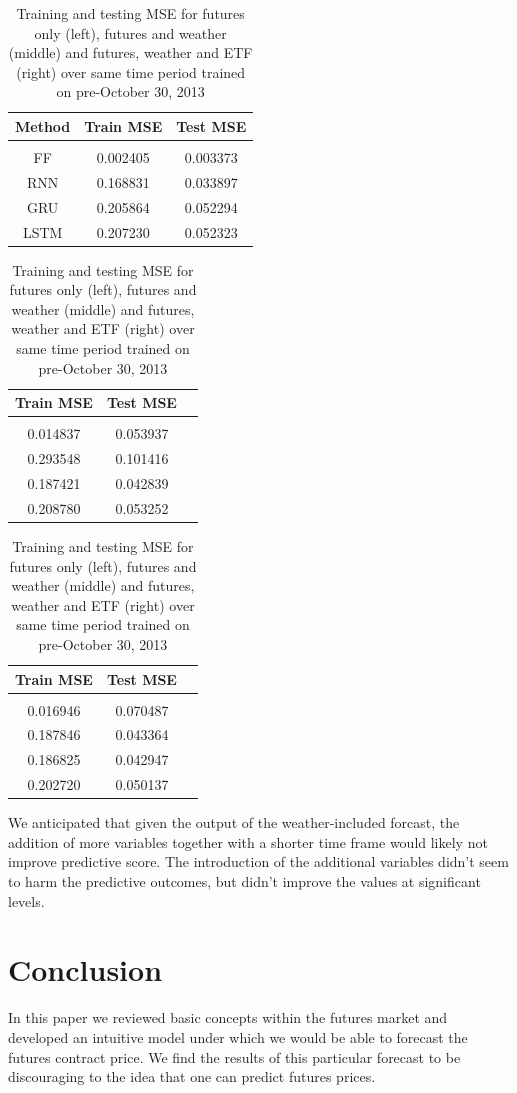 \documentclass[twoside,11pt]{article}
\begin{document}
\begin{table}[h!]
		\begin{tabular}{ccc}
			Method & Train MSE & Test MSE \\
			\hline \\[-11pt]
			FF& 0.002405 & 0.003373 \\
			RNN & 0.168831 & 0.033897 \\ 
			GRU & 0.205864 & 0.052294 \\
			LSTM & 0.207230 & 0.052323 \\
			\hline
		\end{tabular}
		\begin{tabular}{ccc}
			Train MSE & Test MSE \\
			\hline \\[-11pt]
			0.014837 & 0.053937 \\
			0.293548 & 0.101416 \\ 
			0.187421 & 0.042839 \\
			0.208780 & 0.053252 \\
			\hline
		\end{tabular}
			\begin{tabular}{ccc}
		Train MSE & Test MSE \\
		\hline \\[-11pt]
		0.016946 & 0.070487 \\
		0.187846 & 0.043364 \\ 
		0.186825 & 0.042947 \\
		0.202720 & 0.050137 \\
		\hline
	\end{tabular}
		\label{tab:futuresweatherandetf}
		\caption{Training and testing MSE for futures only (left), futures and weather (middle) and futures, weather and ETF (right) over same time period trained on pre-October 30, 2013}
\end{table}

We anticipated that given the output of the weather-included forcast, the addition of more variables together with a shorter time frame would likely not improve predictive score. The introduction of the additional variables didn't seem to harm the predictive outcomes, but didn't improve the values at significant levels. 

\section{Conclusion}

In this paper we reviewed basic concepts within the futures market and developed an intuitive model under which we would be able to forecast the futures contract price. We find the results of this particular forecast to be discouraging to the idea that one can predict futures prices. 
\end{document}
